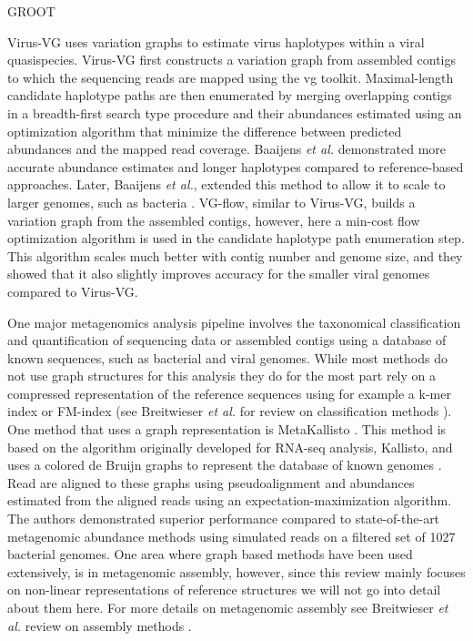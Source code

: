 GROOT \cite{Rowe2018-bg}

Virus-VG uses variation graphs to estimate virus haplotypes within a viral quasispecies.
Virus-VG first constructs a variation graph from assembled contigs to which the sequencing reads are mapped using the vg toolkit.
Maximal-length candidate haplotype paths are then enumerated by merging overlapping contigs in a breadth-first search type procedure and their abundances estimated using an optimization algorithm that minimize the difference between predicted abundances and the mapped read coverage. 
Baaijens \textit{et al.} demonstrated more accurate abundance estimates and longer haplotypes compared to reference-based approaches.
Later, Baaijens \textit{et al.}, extended this method to allow it to scale to larger genomes, such as bacteria \cite{Baaijens2019-ha}.
VG-flow, similar to Virus-VG, builds a variation graph from the assembled contigs, however, here a min-cost flow optimization algorithm is used in the candidate haplotype path enumeration step.
This algorithm scales much better with contig number and genome size, and they showed that it also slightly improves accuracy for the smaller viral genomes compared to Virus-VG. 

One major metagenomics analysis pipeline involves the taxonomical classification and quantification of sequencing data or assembled contigs using a database of known sequences, such as bacterial and viral genomes. 
While most methods do not use graph structures for this analysis they do for the most part rely on a compressed representation of the reference sequences using for example a k-mer index or FM-index (see Breitwieser \textit{et al.} for review on classification methods \cite{Breitwieser2017-yp}). 
One method that uses a graph representation is MetaKallisto \cite{Schaeffer2017-fh}. 
This method is based on the algorithm originally developed for RNA-seq analysis, Kallisto, and uses a colored de Bruijn graphs to represent the database of known genomes \cite{Bray_2016}. 
Read are aligned to these graphs using pseudoalignment and abundances estimated from the aligned reads using an expectation-maximization algorithm. 
The authors demonstrated superior performance compared to state-of-the-art metagenomic abundance methods using simulated reads on a filtered set of 1027 bacterial genomes.
One area where graph based methods have been used extensively, is in metagenomic assembly, however, since this review mainly focuses on non-linear representations of reference structures we will not go into detail about them here. 
For more details on metagenomic assembly see Breitwieser \textit{et al.} review on assembly methods \cite{Breitwieser2017-yp}. 
